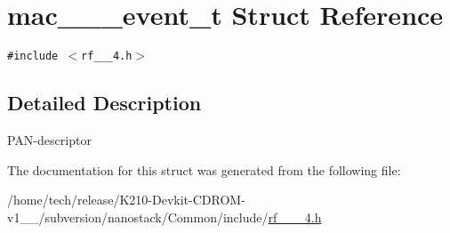 \hypertarget{structmac__15__4__event__t}{
\section{mac\_\_\_\-event\_\-t Struct Reference}
\label{structmac__15__4__event__t}
}
{\tt \#include $<$rf\_\_\_\-4.h$>$}



\subsection{Detailed Description}
PAN-descriptor 



The documentation for this struct was generated from the following file:\begin{CompactItemize}
\item 
/home/tech/release/K210-Devkit-CDROM-v1\_\_/subversion/nanostack/Common/include/\hyperlink{rf__802__15__4_8h}{rf\_\_\_\-4.h}\end{CompactItemize}
